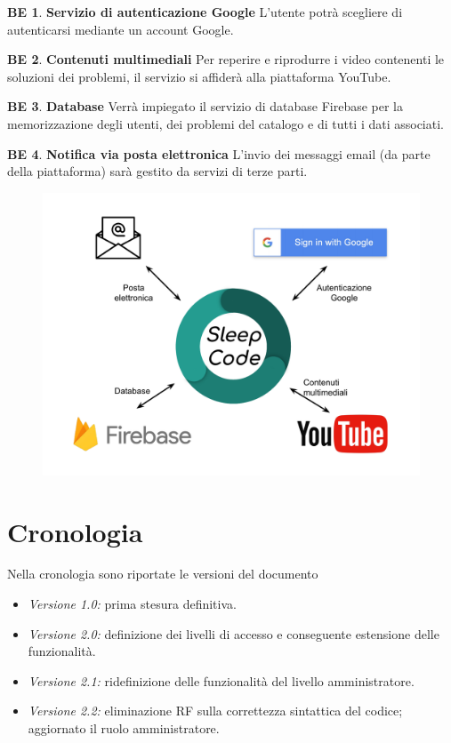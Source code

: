 \documentclass[11pt, a4paper]{article}
\theoremstyle{definition}
\newtheorem{backend}{BE}
\begin{document}
\begin{backend}
\textbf{Servizio di autenticazione Google }
L'utente potrà scegliere di autenticarsi mediante un account Google.
\end{backend}

\begin{backend}
\textbf{Contenuti multimediali }
Per reperire e riprodurre i video contenenti le soluzioni dei problemi,
il servizio si affiderà alla piattaforma YouTube.
\end{backend}

\begin{backend}
\textbf{Database }
Verrà impiegato il servizio di database Firebase per la memorizzazione
degli utenti, dei problemi del catalogo e di tutti i dati associati.
\end{backend}

\begin{backend}
\textbf{Notifica via posta elettronica }
L'invio dei messaggi email (da parte della piattaforma) sarà gestito da servizi di terze parti.
\end{backend}

\begin{figure}[H]
\centering
\includegraphics[scale=0.35]{materiale/immaginife/backend.pdf}
\end{figure}

\newpage
\section{Cronologia}
Nella cronologia sono riportate le versioni del documento
\begin{itemize}
    \item \textit{Versione 1.0:} prima stesura definitiva.
    \item \textit{Versione 2.0:} definizione dei livelli di accesso e conseguente estensione delle funzionalità.
    \item \textit{Versione 2.1:} ridefinizione delle funzionalità del livello amministratore.
    \item \textit{Versione 2.2:} eliminazione RF sulla correttezza sintattica del codice; aggiornato il ruolo amministratore.
\end{itemize}
\end{document}

